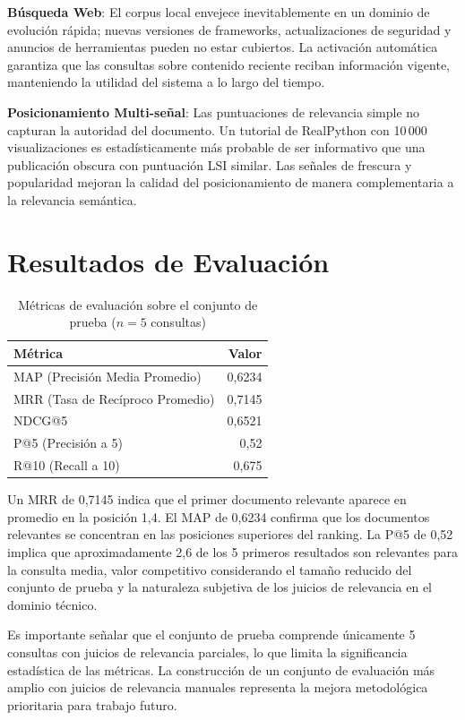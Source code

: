 \documentclass[runningheads,a4paper]{llncs}
\begin{document}
\textbf{Búsqueda Web}: El corpus local envejece inevitablemente en un dominio de evolución rápida; nuevas versiones de frameworks, actualizaciones de seguridad y anuncios de herramientas pueden no estar cubiertos. La activación automática garantiza que las consultas sobre contenido reciente reciban información vigente, manteniendo la utilidad del sistema a lo largo del tiempo.

\textbf{Posicionamiento Multi-señal}: Las puntuaciones de relevancia simple no capturan la autoridad del documento. Un tutorial de RealPython con 10\,000 visualizaciones es estadísticamente más probable de ser informativo que una publicación obscura con puntuación LSI similar. Las señales de frescura y popularidad mejoran la calidad del posicionamiento de manera complementaria a la relevancia semántica.

\section{Resultados de Evaluación}

\begin{table}[h]
\caption{Métricas de evaluación sobre el conjunto de prueba ($n=5$ consultas)}
\centering
\begin{tabular}{lr}
\hline
\textbf{Métrica} & \textbf{Valor} \\
\hline
MAP (Precisión Media Promedio) & 0,6234 \\
MRR (Tasa de Recíproco Promedio) & 0,7145 \\
NDCG@5 & 0,6521 \\
P@5 (Precisión a 5) & 0,52 \\
R@10 (Recall a 10) & 0,675 \\
\hline
\end{tabular}
\end{table}

Un MRR de 0,7145 indica que el primer documento relevante aparece en promedio en la posición 1,4. El MAP de 0,6234 confirma que los documentos relevantes se concentran en las posiciones superiores del ranking. La P@5 de 0,52 implica que aproximadamente 2,6 de los 5 primeros resultados son relevantes para la consulta media, valor competitivo considerando el tamaño reducido del conjunto de prueba y la naturaleza subjetiva de los juicios de relevancia en el dominio técnico.

Es importante señalar que el conjunto de prueba comprende únicamente 5 consultas con juicios de relevancia parciales, lo que limita la significancia estadística de las métricas. La construcción de un conjunto de evaluación más amplio con juicios de relevancia manuales representa la mejora metodológica prioritaria para trabajo futuro.
\end{document}
